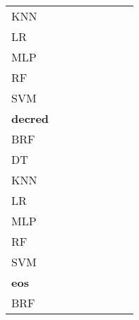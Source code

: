 \documentclass{article}
\begin{document}
{\begin{tabular}{|l|c|c|c|c|c|c|c|}
KNN & \cellcolor{white}  & \cellcolor{black}  & \cellcolor{gray}  & \cellcolor{black}  & \cellcolor{black}  & \cellcolor{white}  & \cellcolor{white}  \\ 
LR & \cellcolor{white}  & \cellcolor{white}  & \cellcolor{white}  & \cellcolor{gray}  & \cellcolor{white}  & \cellcolor{white}  & \cellcolor{white}  \\ 
MLP & \cellcolor{white}  & \cellcolor{white}  & \cellcolor{white}  & \cellcolor{black}  & \cellcolor{gray}  & \cellcolor{white}  & \cellcolor{white}  \\ 
RF & \cellcolor{white}  & \cellcolor{white}  & \cellcolor{white}  & \cellcolor{black}  & \cellcolor{white}  & \cellcolor{gray}  & \cellcolor{black}  \\ 
SVM & \cellcolor{white}  & \cellcolor{white}  & \cellcolor{white}  & \cellcolor{white}  & \cellcolor{white}  & \cellcolor{white}  & \cellcolor{gray}  \\ 
\hline
\textbf{decred} \\ \hline
BRF & \cellcolor{gray}  & \cellcolor{white}  & \cellcolor{white}  & \cellcolor{black}  & \cellcolor{black}  & \cellcolor{white}  & \cellcolor{black}  \\ 
DT & \cellcolor{white}  & \cellcolor{gray}  & \cellcolor{white}  & \cellcolor{black}  & \cellcolor{black}  & \cellcolor{white}  & \cellcolor{white}  \\ 
KNN & \cellcolor{white}  & \cellcolor{white}  & \cellcolor{gray}  & \cellcolor{black}  & \cellcolor{white}  & \cellcolor{white}  & \cellcolor{black}  \\ 
LR & \cellcolor{white}  & \cellcolor{white}  & \cellcolor{white}  & \cellcolor{gray}  & \cellcolor{white}  & \cellcolor{white}  & \cellcolor{white}  \\ 
MLP & \cellcolor{white}  & \cellcolor{white}  & \cellcolor{white}  & \cellcolor{white}  & \cellcolor{gray}  & \cellcolor{white}  & \cellcolor{white}  \\ 
RF & \cellcolor{white}  & \cellcolor{white}  & \cellcolor{white}  & \cellcolor{black}  & \cellcolor{white}  & \cellcolor{gray}  & \cellcolor{black}  \\ 
SVM & \cellcolor{white}  & \cellcolor{white}  & \cellcolor{white}  & \cellcolor{black}  & \cellcolor{black}  & \cellcolor{white}  & \cellcolor{gray}  \\ 
\hline
\textbf{eos} \\ \hline
BRF & \cellcolor{gray}  & \cellcolor{black}  & \cellcolor{white}  & \cellcolor{black}  & \cellcolor{black}  & \cellcolor{white}  & \cellcolor{black}  \\ 

\end{tabular}}
\end{document}
